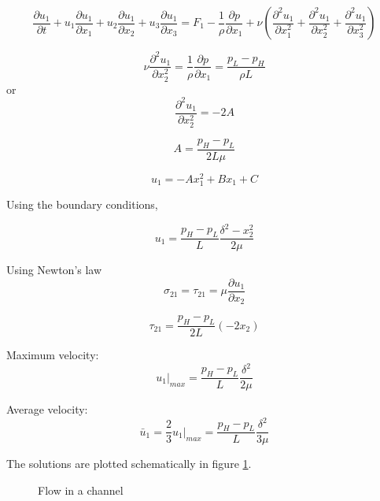 \begin{equation}
\frac{\partial u_1}{\partial t} + u_1\frac{\partial u_1}{\partial x_1} + u_2\frac{\partial u_1}{\partial x_2} + u_3\frac{\partial u_1}{\partial x_3} = F_1 -  \frac{1}{\rho}\frac{\partial p}{\partial x_1} + \nu \left( \frac{\partial^2 u_1}{\partial x_1^2} + \frac{\partial^2 u_1}{\partial x_2^2} + \frac{\partial^2 u_1}{\partial x_3^2} \right)
\end{equation} 

\begin{equation}
\nu \frac{\partial^2 u_1}{\partial x_2^2} = \frac{1}{\rho}\frac{\partial p}{\partial x_1} = \frac{p_L-p_H}{\rho L} 
\end{equation} 
or
\begin{equation}
\frac{\partial^2 u_1}{\partial x_2^2} = -2A 
\end{equation} 

$$A = \frac{p_H-p_L}{2L \mu}$$

$$u_1 = -A x_1^2 + B x_1 + C$$

Using the boundary conditions,

$$\boxed{u_1 = \frac{p_H - p_L}{L} \frac{\delta^2 -x_2^2}{2\mu} }$$

Using Newton's law $$\sigma_{21} = \tau_{21} = \mu \frac{\partial u_1}{\partial x_2}$$

$$\tau_{21} = \frac{p_H - p_L}{2 L} \left( -2x_2 \right)$$

Maximum velocity:
$$\boxed{u_1|_{max} = \frac{p_H - p_L}{L} \frac{\delta^2}{2 \mu}} $$

Average velocity:
$$\boxed{ \bar{u}_1 = \frac{2}{3} u_1|_{max}  = \frac{p_H - p_L}{L} \frac{\delta^2}{3 \mu} }$$


The solutions are plotted schematically in figure \ref{chansol}.

\begin{figure}[h]
\begin{center}
\end{center}
\caption{Flow in a channel}
\label{chansol}
\end{figure}

